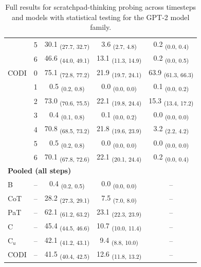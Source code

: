 \begin{table}[h!]
\begin{tabular}{ll ccc}
 & 5 & 30.1 \textsubscript{(27.7, 32.7)} & 3.6 \textsubscript{(2.7, 4.8)} & 0.2 \textsubscript{(0.0, 0.4)} \\
 & 6 & 46.6 \textsubscript{(44.0, 49.1)} & 13.1 \textsubscript{(11.3, 14.9)} & 0.2 \textsubscript{(0.0, 0.5)} \\
\midrule
CODI & 0 & 75.1 \textsubscript{(72.8, 77.2)} & 21.9 \textsubscript{(19.7, 24.1)} & 63.9 \textsubscript{(61.3, 66.3)} \\
 & 1 & 0.5 \textsubscript{(0.2, 0.8)} & 0.0 \textsubscript{(0.0, 0.0)} & 0.1 \textsubscript{(0.0, 0.2)} \\
 & 2 & 73.0 \textsubscript{(70.6, 75.5)} & 22.1 \textsubscript{(19.8, 24.4)} & 15.3 \textsubscript{(13.4, 17.2)} \\
 & 3 & 0.4 \textsubscript{(0.1, 0.8)} & 0.1 \textsubscript{(0.0, 0.2)} & 0.0 \textsubscript{(0.0, 0.0)} \\
 & 4 & 70.8 \textsubscript{(68.5, 73.2)} & 21.8 \textsubscript{(19.6, 23.9)} & 3.2 \textsubscript{(2.2, 4.2)} \\
 & 5 & 0.5 \textsubscript{(0.2, 0.8)} & 0.0 \textsubscript{(0.0, 0.0)} & 0.0 \textsubscript{(0.0, 0.0)} \\
 & 6 & 70.1 \textsubscript{(67.8, 72.6)} & 22.1 \textsubscript{(20.1, 24.4)} & 0.2 \textsubscript{(0.0, 0.4)} \\
\midrule
\multicolumn{5}{l}{\textbf{Pooled (all steps)}} \\
B & -- & 0.4 \textsubscript{(0.2, 0.5)} & 0.0 \textsubscript{(0.0, 0.0)} & -- \\
CoT & -- & 28.2 \textsubscript{(27.3, 29.1)} & 7.5 \textsubscript{(7.0, 8.0)} & -- \\
PaT & -- & 62.1 \textsubscript{(61.2, 63.2)} & 23.1 \textsubscript{(22.3, 23.9)} & -- \\
C & -- & 45.4 \textsubscript{(44.5, 46.6)} & 10.7 \textsubscript{(10.0, 11.4)} & -- \\
C$_u$ & -- & 42.1 \textsubscript{(41.2, 43.1)} & 9.4 \textsubscript{(8.8, 10.0)} & -- \\
CODI & -- & 41.5 \textsubscript{(40.4, 42.5)} & 12.6 \textsubscript{(11.8, 13.2)} & -- \\
\bottomrule
\end{tabular}
\caption{Full results for scratchpad-thinking probing across timesteps and models with statistical testing for the GPT-2 model family.}
\label{tab:scratchpad_gpt2}
\end{table}
